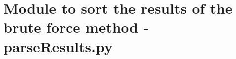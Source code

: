 
\chapter{Module to sort the results of the brute force method - parseResults.py} %

\label{AppendixE} %









